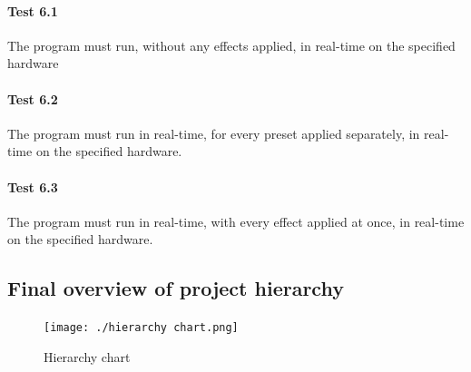 \paragraph{Test 6.1} The program must run, without any effects applied, in real-time on the specified hardware
\paragraph{Test 6.2} The program must run in real-time, for every preset applied separately, in real-time on the specified hardware.
\paragraph{Test 6.3} The program must run in real-time, with every effect applied at once, in real-time on the specified hardware.

\pagebreak
\subsection{Final overview of project hierarchy}
\begin{figure}[H]
	\texttt{[image: ./hierarchy chart.png]}
	\caption{Hierarchy chart }
\end{figure}
